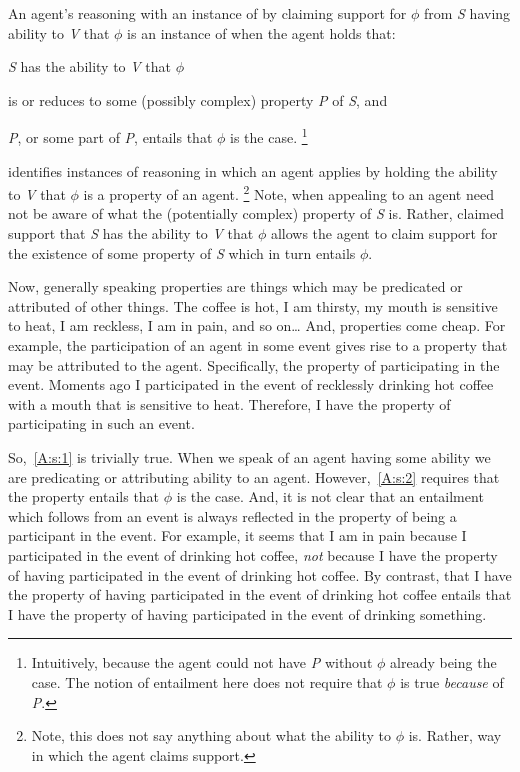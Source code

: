 \begin{note}
  \begin{definition}[\AR{}]\label{AR:def}
    An agent's reasoning with an instance of  by claiming support for \(\phi\) from \emph{S} having ability to \emph{V} that \(\phi\) is an instance of \emph{\AR{}} when the agent holds that:

    \emph{S} has the ability to \emph{V} that \(\phi\)
    \begin{enumerate*}[label=(\textsf{A}\arabic*), ref=(\textsf{A}\arabic*)]
    \item\label{A:s:1} is or reduces to some (possibly complex) property \emph{P} of \emph{S}, and
    \item\label{A:s:2} \emph{P}, or some part of \emph{P}, entails that \(\phi\) is the case.\nolinebreak
      \footnote{Intuitively, because the agent could not have \emph{P} without \(\phi\) already being the case.
      The notion of entailment here does not require that \(\phi\) is true \emph{because} of \emph{P}.}
    \end{enumerate*}
  \end{definition}

  {
    \color{red}
    \AR{} identifies instances of reasoning in which an agent applies  by holding the ability to \emph{V} that \(\phi\) is a property of an agent.\nolinebreak
    \footnote{
      Note, this does not say anything about what the ability to \(\phi\) is.
      Rather, way in which the agent claims support.
    }
    Note, when appealing to  an agent need not be aware of what the (potentially complex) property of \emph{S} is.
    Rather, claimed support that \emph{S} has the ability to \emph{V} that \(\phi\) allows the agent to claim support for the existence of some property of \emph{S} which in turn entails \(\phi\).
  }

  Now, generally speaking properties are things which may be predicated or attributed of other things.
  The coffee is hot, I am thirsty, my mouth is sensitive to heat, I am reckless, I am in pain, and so on\dots
  And, properties come cheap.
  For example, the participation of an agent in some event gives rise to a property that may be attributed to the agent.
  Specifically, the property of participating in the event.
  Moments ago I participated in the event of recklessly drinking hot coffee with a mouth that is sensitive to heat.
  Therefore, I have the property of participating in such an event.

  So,~\ref{A:s:1} is trivially true.
  When we speak of an agent having some ability we are predicating or attributing ability to an agent.
  However,~\ref{A:s:2} requires that the property entails that \(\phi\) is the case.
  And, it is not clear that an entailment which follows from an event is always reflected in the property of being a participant in the event.
  For example, it seems that I am in pain because I participated in the event of drinking hot coffee, \emph{not} because I have the property of having participated in the event of drinking hot coffee.
  By contrast, that I have the property of having participated in the event of drinking hot coffee entails that I have the property of having participated in the event of drinking something.


\end{note}
